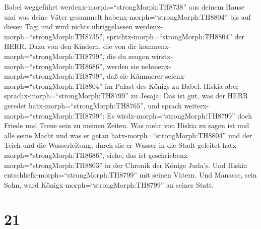 Babel weggeführt werdenx-morph=``strongMorph:TH8738'' aus deinem Hause
und was deine Väter gesammelt habenx-morph=``strongMorph:TH8804'' bis
auf diesen Tag; und wird nichts übriggelassen
werdenx-morph=``strongMorph:TH8735'',
sprichtx-morph=``strongMorph:TH8804'' der HERR.  Dazu von
den Kindern, die von dir kommenx-morph=``strongMorph:TH8799'', die du
zeugen wirstx-morph=``strongMorph:TH8686'', werden sie
nehmenx-morph=``strongMorph:TH8799'', daß sie Kämmerer
seienx-morph=``strongMorph:TH8804'' im Palast des Königs zu Babel.
 Hiskia aber sprachx-morph=``strongMorph:TH8799'' zu
Jesaja: Das ist gut, was der HERR geredet
hatx-morph=``strongMorph:TH8765'', und sprach
weiterx-morph=``strongMorph:TH8799'': Es
wirdx-morph=``strongMorph:TH8799'' doch Friede und Treue sein zu meinen
Zeiten.  Was mehr von Hiskia zu sagen ist und alle seine
Macht und was er getan hatx-morph=``strongMorph:TH8804'' und der Teich
und die Wasserleitung, durch die er Wasser in die Stadt geleitet
hatx-morph=``strongMorph:TH8686'', siehe, das ist
geschriebenx-morph=``strongMorph:TH8803'' in der Chronik der Könige
Juda's.  Und Hiskia
entschliefx-morph=``strongMorph:TH8799'' mit seinen Vätern. Und Manasse,
sein Sohn, ward Königx-morph=``strongMorph:TH8799'' an seiner Statt.

\hypertarget{section-20}{%
\section{21}\label{section-20}}

